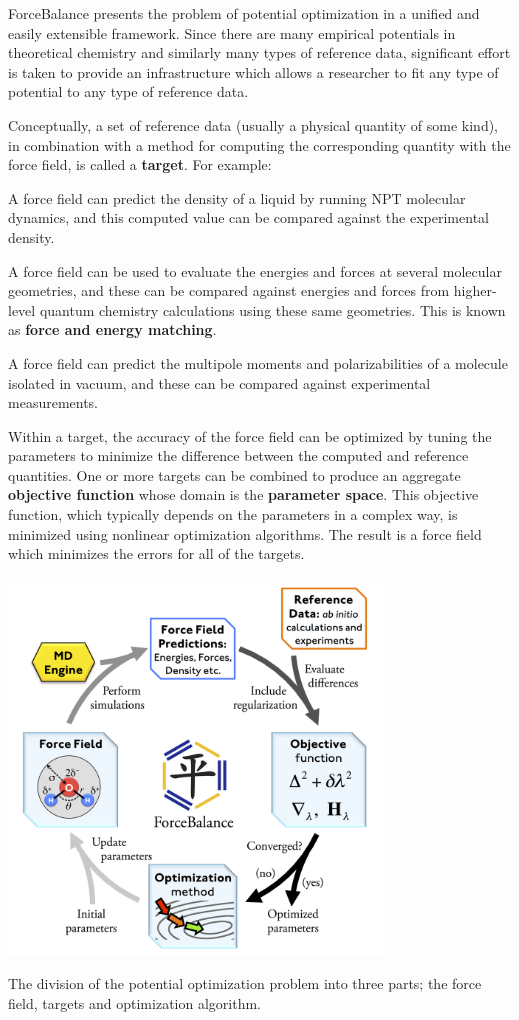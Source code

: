 Force\-Balance presents the problem of potential optimization in a unified and easily extensible framework. Since there are many empirical potentials in theoretical chemistry and similarly many types of reference data, significant effort is taken to provide an infrastructure which allows a researcher to fit any type of potential to any type of reference data.

Conceptually, a set of reference data (usually a physical quantity of some kind), in combination with a method for computing the corresponding quantity with the force field, is called a {\bfseries target}. For example\-:


\begin{DoxyItemize}
\item A force field can predict the density of a liquid by running N\-P\-T molecular dynamics, and this computed value can be compared against the experimental density.
\item A force field can be used to evaluate the energies and forces at several molecular geometries, and these can be compared against energies and forces from higher-\/level quantum chemistry calculations using these same geometries. This is known as {\bfseries force and energy matching}.
\item A force field can predict the multipole moments and polarizabilities of a molecule isolated in vacuum, and these can be compared against experimental measurements.
\end{DoxyItemize}

Within a target, the accuracy of the force field can be optimized by tuning the parameters to minimize the difference between the computed and reference quantities. One or more targets can be combined to produce an aggregate {\bfseries objective function} whose domain is the {\bfseries parameter space}. This objective function, which typically depends on the parameters in a complex way, is minimized using nonlinear optimization algorithms. The result is a force field which minimizes the errors for all of the targets.


\begin{DoxyImage}
\includegraphics[height=10cm]{cycle.png}
\caption{The division of the potential optimization problem into three parts; the force field, targets and optimization algorithm.}
\end{DoxyImage}


